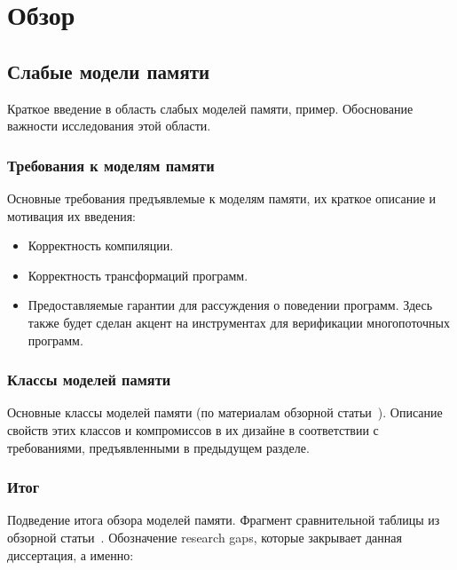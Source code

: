 \chapter{Обзор}
\label{ch:review}

\section{Слабые модели памяти}


Краткое введение в область слабых моделей памяти, пример. 
Обоснование важности исследования этой области.  

\subsection{Требования к моделям памяти}

Основные требования предъявлемые к моделям памяти,
их краткое описание и мотивация их введения:

\begin{itemize}
  \item Корректность компиляции.
  \item Корректность трансформаций программ.
  \item Предоставляемые гарантии для рассуждения о поведении программ.
    Здесь также будет сделан акцент на инструментах
    для верификации многопоточных программ. 
\end{itemize}

\subsection{Классы моделей памяти}

Основные классы моделей памяти (по материалам обзорной статьи~\cite{Moiseenko-al:PCS21}).
Описание свойств этих классов и компромиссов в их дизайне
в соответствии с требованиями, предъявленными в предыдущем разделе. 

\subsection{Итог}

Подведение итога обзора моделей памяти.
Фрагмент сравнительной таблицы из обзорной статьи~\cite{Moiseenko-al:PCS21}.
Обозначение research gaps, которые закрывает данная диссертация, а именно:

